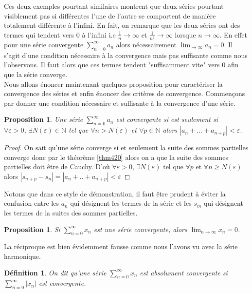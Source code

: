 \documentclass[a4paper, 12pt, french, twoside]{article}
\newtheorem{proposition}[theorem]{Proposition}
\newtheorem{defi}[theorem]{Définition}
\newcommand{\Nn}{{\mathbb{N}}}
\begin{document}
Ces deux exemples pourtant similaires montrent que deux séries pourtant visiblement pas si différentes l'une de l'autre se comportent de manière totalement différente à l'infini. En fait, on remarque que les deux séries ont des termes qui tendent vers 0 à l'infini i.e $\frac{1}{n} \rightarrow \infty$ et $\frac{1}{n^2} \rightarrow \infty$ lorsque $n \rightarrow \infty$. En effet pour une série convergente $\sum_{n=0}^{\infty} a_n$ alors nécessairement $\lim_{\to \infty} a_n = 0$. Il s'agit d'une condition nécessaire à la convergence mais pas suffisante comme nous l'observons. Il faut alors que ces termes tendent "suffisamment vite" vers 0 afin que la série converge. 
\newline
\\Nous allons énoncer maintenant quelques proposition pour caractériser la convergence des séries et enfin énoncer des critères de convergence.
Commençons par donner une condition nécessaire et suffisante à la convergence d'une série.
\begin{proposition}
    Une série $\sum_{n = 0}^{\infty} a_n$ est convergente si est seulement si 
    \\\quad $ \forall \varepsilon > 0$, $\exists N(\varepsilon) \in \Nn $ tel que $\forall n > N(\varepsilon)$ et $\forall p \in \Nn $ alors $|a_n + ... + a_{n+p}| < \varepsilon$. 
\end{proposition}
\begin{proof}
   On sait qu'une série converge si et seulement la suite des sommes partielles converge donc par le théorème \ref{thm420} alors on a que la suite des sommes partielles doit être de Cauchy. D'où $\forall \varepsilon >0 $, $\exists N(\varepsilon)$ tel que $\forall p$ et $\forall n \ge N(\varepsilon)$ alors $|s_{n+p} - s_n| = | a_n + .. + a_{n+p}| < \varepsilon$ 
\end{proof}
Notons que dans ce style de démonstration, il faut être prudent à éviter la confusion entre les $a_n$ qui désignent les termes de la série et les $s_m$ qui désignent les termes de la suites des sommes partielles. 


\begin{proposition}
    Si $\sum_{n=0}^{\infty} x_n$ est une série convergente, alors $\lim_{n\rightarrow\infty}x_n=0$.
\end{proposition}
 La réciproque est bien évidemment fausse comme nous l'avons vu avec la série harmonique. 
\begin{defi}
    On dit qu'une série $\sum_{n=0}^{\infty} x_n$ est absolument convergente si $\sum_{n=0}^{\infty} |x_n|$ est convergente.
\end{defi}
\end{document}
